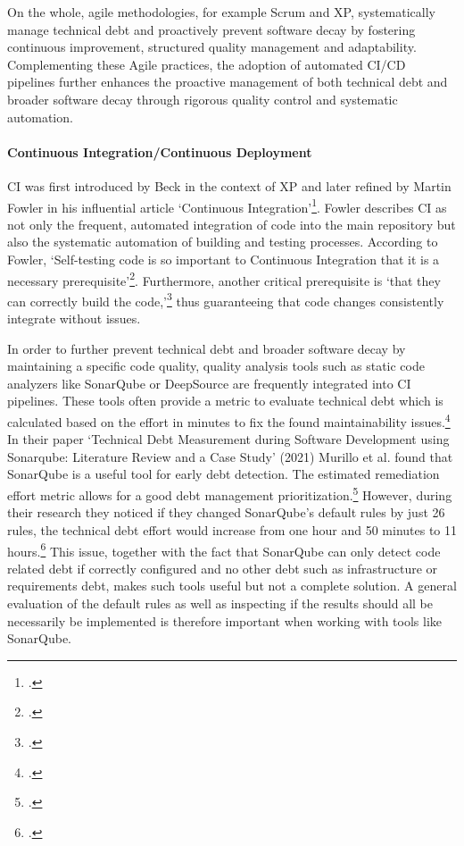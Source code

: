 On the whole, agile methodologies, for example Scrum and \ac{XP}, systematically manage technical debt and proactively prevent software decay by fostering continuous improvement, structured quality management and adaptability.
Complementing these Agile practices, the adoption of automated \ac{CI/CD} pipelines further enhances the proactive management of both technical debt
and broader software decay through rigorous quality control and systematic automation.

\paragraph{Continuous Integration/Continuous Deployment}
\ac{CI} was first introduced by Beck in the context of \ac{XP} and later refined by Martin Fowler in his influential article `Continuous Integration'\footcite[no page number.]{fowlerContinuousIntegration2006}.
Fowler describes \ac{CI} as not only the frequent, automated integration of code into the main repository but also the systematic automation of building and testing processes.
According to Fowler, `Self-testing code is so important to Continuous Integration that it is a necessary prerequisite'\footcite[no page number]{fowlerContinuousIntegration2006}.
Furthermore, another critical prerequisite is `that they can correctly build the code,'\footcite[no page number]{fowlerContinuousIntegration2006} thus guaranteeing that code changes consistently
integrate without issues.

In order to further prevent technical debt and broader software decay by maintaining a specific code quality, quality analysis tools such as static code analyzers like SonarQube or DeepSource are frequently integrated into
\ac{CI} pipelines. These tools often provide a metric to evaluate technical debt which is calculated based on the effort in minutes to fix the found maintainability issues.\footcite[no page number]{sonarqubeUnderstandingMeasuresMetrics2025}
In their paper `Technical Debt Measurement during Software Development using Sonarqube: Literature Review and a Case Study' (2021)
Murillo et al. found that SonarQube is a useful tool for early debt detection. The estimated remediation effort metric allows for a good debt management prioritization.\footcite[5]{murilloTechnicalDebtMeasurement2021}
However, during their research they noticed if they changed SonarQube's default rules by just 26 rules, the technical debt effort would increase from
one hour and 50 minutes to 11 hours.\footcite[4]{murilloTechnicalDebtMeasurement2021} This issue, together with the fact that SonarQube can only detect code related debt if correctly configured and no other debt such as
infrastructure or requirements debt, makes such tools useful but not a complete solution. A general evaluation of the default rules as well as inspecting if the results should all be necessarily be implemented is therefore important when working with tools like SonarQube.

